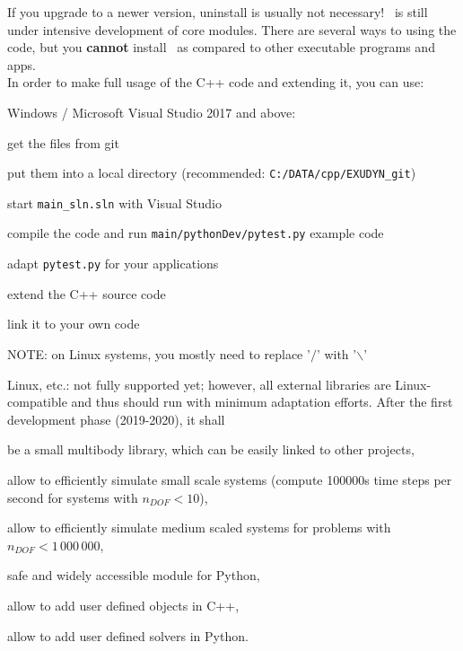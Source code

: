 If you upgrade to a newer version, uninstall is usually not necessary!
%
\codeName\ is still under intensive development of core modules.
There are several ways to using the code, but you {\bf cannot} install \codeName\ as compared to other executable programs and apps.
\vspace{6pt}\\
In order to make full usage of the C++ code and extending it, you can use:
\bi
	\item Windows / Microsoft Visual Studio 2017 and above:
	\bi
		\item get the files from git
		\item put them into a local directory (recommended: \texttt{C:/DATA/cpp/EXUDYN\_git})
		\item start \texttt{main\_sln.sln} with Visual Studio
		\item compile the code and run \texttt{main/pythonDev/pytest.py} example code
		\item adapt \texttt{pytest.py} for your applications
		\item extend the C++ source code
		\item link it to your own code
		\item NOTE: on Linux systems, you mostly need to replace '$/$' with '$\backslash$'
	\ei
	\item Linux, etc.: not fully supported yet; however, all external libraries are Linux-compatible and thus should run with minimum adaptation efforts.
\ei
%
After the first development phase (2019-2020), it shall
\bi
  \item be a small multibody library, which can be easily linked to other projects,
	\item allow to efficiently simulate small scale systems (compute 100000s time steps per second for systems with $n_{DOF}<10$),
	\item allow to efficiently simulate medium scaled systems for problems with $n_{DOF} < 1\,000\,000$,
	\item safe and widely accessible module for Python,
	\item allow to add user defined objects in C++,
	\item allow to add user defined solvers in Python.
